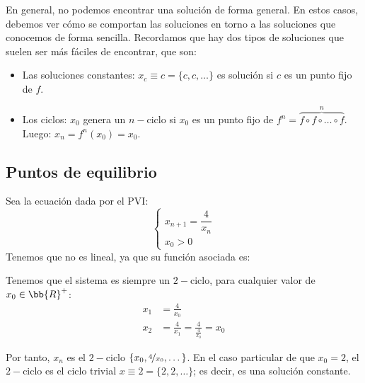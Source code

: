 En general, no podemos encontrar una solución de forma general. En estos casos, debemos ver cómo se comportan las soluciones en torno a las soluciones que conocemos de forma sencilla. Recordamos que hay dos tipos de soluciones que suelen ser más fáciles de encontrar, que son:
\begin{itemize}
    \item Las soluciones constantes: $x_c\equiv c = \{c, c, \ldots \}$ es solución si $c$ es un punto fijo de $f$.
    \item Los ciclos: 
    $x_0$ genera un $n-$ciclo si $x_0$ es un punto fijo de $f^n=\overbrace{f\circ f \circ \ldots \circ f}^{n}$. Luego: $x_n = f^n(x_0) = x_0$.
\end{itemize}


\subsection{Puntos de equilibrio}
\begin{ejemplo}
    Sea la ecuación dada por el PVI:
    \begin{equation*}
    \left\{ \begin{array}{l}
        x_{n+1} = \dfrac{4}{x_n} \\
        x_0 > 0
    \end{array}\right.
    \end{equation*}
    Tenemos que no es lineal, ya que su función asociada es:

    Tenemos que el sistema es siempre un $2-$ciclo, para cualquier valor de $x_0 \in \bb{R}^+$:
    \begin{align*}
        x_1 &= \frac{4}{x_0}\\
        x_2 &= \frac{4}{x_1} = \frac{4}{\frac{4}{x_0}}=x_0
    \end{align*}

    Por tanto, $x_n$ es el $2-$ciclo $\{x_0, \nicefrac{4}{x_0}, \dots\}$.
    En el caso particular de que $x_0=2$, el $2-$ciclo es el ciclo trivial $x\equiv 2 = \{2,2,\ldots\}$; es decir, es una solución constante.
\end{ejemplo}

